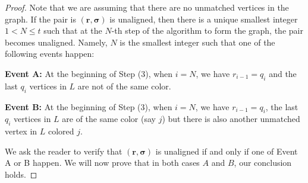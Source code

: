 \documentclass[11pt]{article}
\numberwithin{equation}{section}
\theoremstyle{definition}
\theoremstyle{plain}
\begin{document}
\begin{proof}
Note that we are assuming that there are no unmatched vertices in the graph. If the pair is $(\mathbf{r}, \boldsymbol{\sigma})$ is unaligned, then there is a unique smallest integer $1 < N\le t$ such that at the $N$-{th} step of the algorithm to form the graph, the pair becomes unaligned. Namely, $N$ is the smallest integer such that one of the following events happen:

\smallskip
\noindent
\textbf{Event A:} At the beginning of Step (3), when $i=N$, we have $r_{i-1} = q_{i}$ and the last $q_i$ vertices in $L$ are not of the same color. 

\smallskip
\noindent
\textbf{Event B:} At the beginning of Step (3), when $i=N$, we have $r_{i-1} = q_{i}$, the last $q_i$ vertices in $L$ are of the same color (say $j$) but there is also another unmatched vertex in $L$ colored $j$. 

We ask the reader to verify that  $(\mathbf{r}, \boldsymbol{\sigma})$ is unaligned if and only if one of Event A or B happen. We will now prove that in both cases $A$ and $B$, our conclusion holds.


\end{proof}
\end{document}
